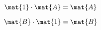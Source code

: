 \begin{forslides}
          
             \begin{equation}
                \label{eq:semicats-slides-133}
                \mat{1} \cdot \mat{A} = \mat{A}
            \end{equation}
            
            
             \begin{equation}
                \label{eq:semicats-slides-134}
                 \mat{B} \cdot \mat{1} = \mat{B}
            \end{equation}
            
  \begin{comment}                
             \begin{equation}
                \label{eq:semicats-slides-135}
                
            \end{equation}
            
           
             \begin{equation}
                \label{eq:semicats-slides-136}
                
            \end{equation}
            
            
             \begin{equation}
                \label{eq:semicats-slides-137}
                
            \end{equation}
            
           
            
                   \begin{equation}
                \label{eq:semicats-slides-138}
                
            \end{equation}
            
            
             \begin{equation}
                \label{eq:semicats-slides-139}
                
            \end{equation}
            
            
             \begin{equation}
                \label{eq:semicats-slides-140}
                
            \end{equation}
            
            
             \begin{equation}
                \label{eq:semicats-slides-141}
                

\end{comment}
\end{forslides}
